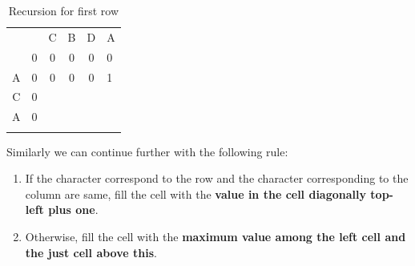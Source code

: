 \documentclass[a4paper,11pt]{book}
\begin{document}
\begin{table}[ht]
\centering
\begin{tabular}{cccccl}
                       &                        & C                      & B                      & D                      & A                      \\ \cline{2-6} 
\multicolumn{1}{c|}{}  & \multicolumn{1}{c|}{0} & \multicolumn{1}{c|}{0} & \multicolumn{1}{c|}{0} & \multicolumn{1}{c|}{0} & \multicolumn{1}{l|}{0} \\ \cline{2-6} 
\multicolumn{1}{c|}{A} & \multicolumn{1}{c|}{0} & \multicolumn{1}{c|}{0} & \multicolumn{1}{c|}{0} & \multicolumn{1}{c|}{0} & \multicolumn{1}{l|}{1} \\ \cline{2-6} 
\multicolumn{1}{c|}{C} & \multicolumn{1}{c|}{0} & \multicolumn{1}{c|}{}  & \multicolumn{1}{c|}{}  & \multicolumn{1}{c|}{}  & \multicolumn{1}{l|}{}  \\ \cline{2-6} 
\multicolumn{1}{c|}{A} & \multicolumn{1}{c|}{0} & \multicolumn{1}{c|}{}  & \multicolumn{1}{c|}{}  & \multicolumn{1}{c|}{}  & \multicolumn{1}{l|}{}  \\ \cline{2-6} 
\multicolumn{1}{l}{}   & \multicolumn{1}{l}{}   & \multicolumn{1}{l}{}   & \multicolumn{1}{l}{}   & \multicolumn{1}{l}{}   &                       
\end{tabular}
\caption{Recursion for first row}
\end{table}

\noindent Similarly we can continue further with the following rule:
\begin{enumerate}
    \item If the character correspond to the row and the character corresponding to the column are same, fill the cell with the \textbf{value in the cell diagonally top-left plus one}. 
    \item Otherwise, fill the cell with the \textbf{maximum value among the left cell and the just cell above this}.
\end{enumerate}
\end{document}
